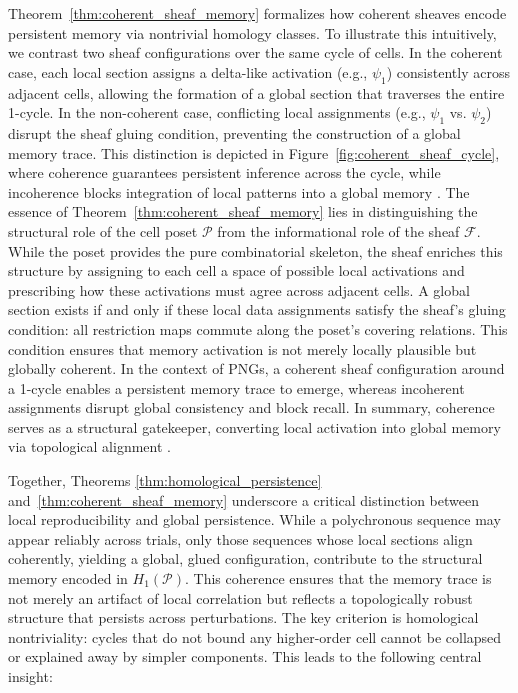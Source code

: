 \documentclass[lettersize,journal]{IEEEtran}
\begin{document}
Theorem~\ref{thm:coherent_sheaf_memory} formalizes how coherent sheaves encode persistent memory via nontrivial homology classes. To illustrate this intuitively, we contrast two sheaf configurations over the same cycle of cells. In the coherent case, each local section assigns a delta-like activation (e.g., \( \psi_1 \)) consistently across adjacent cells, allowing the formation of a global section that traverses the entire 1-cycle. In the non-coherent case, conflicting local assignments (e.g., \( \psi_1 \) vs. \( \psi_2 \)) disrupt the sheaf gluing condition, preventing the construction of a global memory trace. This distinction is depicted in Figure~\ref{fig:coherent_sheaf_cycle}, where coherence guarantees persistent inference across the cycle, while incoherence blocks integration of local patterns into a global memory \cite{abramsky2011sheaf}.
The essence of Theorem~\ref{thm:coherent_sheaf_memory} lies in distinguishing the structural role of the cell poset \( \mathcal{P} \) from the informational role of the sheaf \( \mathcal{F} \). While the poset provides the pure combinatorial skeleton, the sheaf enriches this structure by assigning to each cell a space of possible local activations and prescribing how these activations must agree across adjacent cells. A global section exists if and only if these local data assignments satisfy the sheaf's gluing condition: all restriction maps commute along the poset's covering relations. This condition ensures that memory activation is not merely locally plausible but globally coherent. 
In the context of PNGs, a coherent sheaf configuration around a 1-cycle enables a persistent memory trace to emerge, whereas incoherent assignments disrupt global consistency and block recall.
In summary, coherence serves as a structural gatekeeper, converting local activation into global memory via topological alignment \cite{schmid2025applied}.


Together, Theorems \ref{thm:homological_persistence} and~\ref{thm:coherent_sheaf_memory} underscore a critical distinction between local reproducibility and global persistence. While a polychronous sequence may appear reliably across trials, only those sequences whose local sections align coherently, yielding a global, glued configuration, contribute to the structural memory encoded in \( H_1(\mathcal{P}) \). This coherence ensures that the memory trace is not merely an artifact of local correlation but reflects a topologically robust structure that persists across perturbations. The key criterion is homological nontriviality: cycles that do not bound any higher-order cell cannot be collapsed or explained away by simpler components. This leads to the following central insight:
\end{document}
